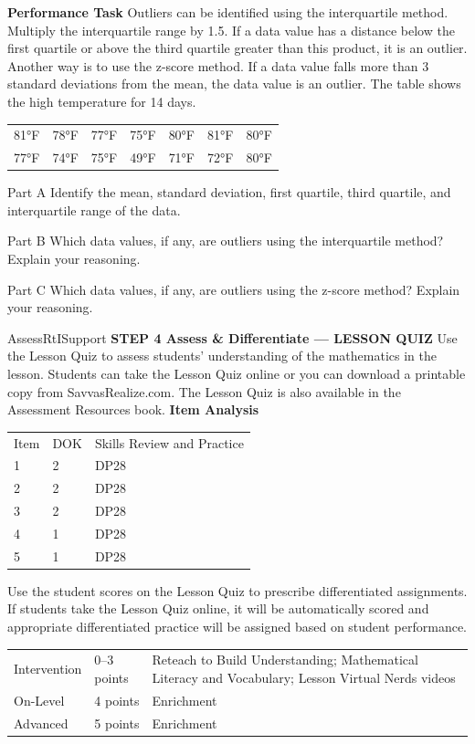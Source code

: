 \documentclass{article}
\newenvironment{practice}[2]{}{}        %
\newenvironment{te-addendum}[2]{}{}     %
\newcommand{\answer}[1]{}               %
\begin{document}
\begin{practice}{34}{3}
\textbf{Performance Task} Outliers can be identified using the interquartile method. Multiply the interquartile range by 1.5. If a data value has a distance below the first quartile or above the third quartile greater than this product, it is an outlier. Another way is to use the z-score method. If a data value falls more than 3 standard deviations from the mean, the data value is an outlier. The table shows the high temperature for 14 days.
\begin{tabular}{rrrrrrr}
81°F & 78°F & 77°F & 75°F & 80°F & 81°F & 80°F \\
77°F & 74°F & 75°F & 49°F & 71°F & 72°F & 80°F \\
\end{tabular}
Part A Identify the mean, standard deviation, first quartile, third quartile, and interquartile range of the data.
\answer{Part A mean: 75; standard deviation: 7.86; first quartile: 74; third quartile: 80; interquartile range: 6}
Part B Which data values, if any, are outliers using the interquartile method? Explain your reasoning.
\answer{Part B The data value 49°F is more than 1.5(6), or 9°F below the first quartile. So, 49°F is an outlier.}
Part C Which data values, if any, are outliers using the z-score method? Explain your reasoning.
\answer{Part C The data value 49°F is more than 3 standard deviations, or 3(7.86) = 23.58°F, below the mean. So, 49°F is an outlier.}
\end{practice}
\begin{te-addendum}{Assess}{RtISupport}
\textbf{STEP 4 Assess & Differentiate — LESSON QUIZ}
Use the Lesson Quiz to assess students' understanding of the mathematics in the lesson.
Students can take the Lesson Quiz online or you can download a printable copy from SavvasRealize.com. The Lesson Quiz is also available in the Assessment Resources book.
\textbf{Item Analysis}
\begin{tabular}{lll}
Item & DOK & Skills Review and Practice \\
1 & 2 & DP28 \\
2 & 2 & DP28 \\
3 & 2 & DP28 \\
4 & 1 & DP28 \\
5 & 1 & DP28 \\
\end{tabular}
Use the student scores on the Lesson Quiz to prescribe differentiated assignments.
If students take the Lesson Quiz online, it will be automatically scored and appropriate differentiated practice will be assigned based on student performance.
\begin{tabular}{lll}
Intervention & 0–3 points & Reteach to Build Understanding; Mathematical Literacy and Vocabulary; Lesson Virtual Nerds videos \\
On-Level & 4 points & Enrichment \\
Advanced & 5 points & Enrichment \\
\end{tabular}
\end{te-addendum}
\end{document}
